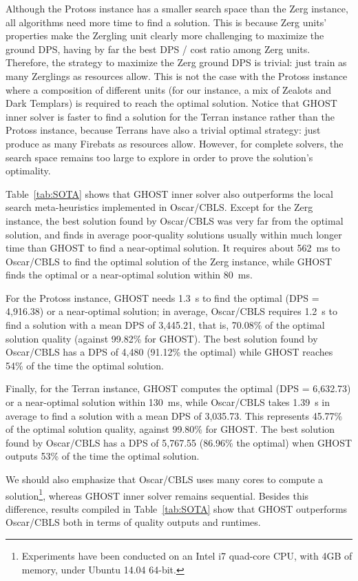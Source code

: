 \documentclass[journal]{IEEEtran}
\newcommand{\ghost}{\textsc{GHOST}\xspace}
\begin{document}
Although the Protoss instance has a smaller search space than the Zerg
instance, all algorithms  need more time to find a  solution.  This is
because Zerg  units' properties make  the Zergling unit  clearly more
challenging to maximize  the ground DPS, having by far  the best DPS /
cost ratio among  Zerg units.  Therefore, the strategy  to maximize the
Zerg ground DPS is trivial: just  train as many Zerglings as resources
allow. This  is not the case with the  Protoss instance where a
composition of different units (for our instance, a mix of Zealots and
Dark Templars) is required to  reach the optimal solution. Notice that
\ghost  inner solver is  faster to find  a solution for  the Terran
instance rather  than the  Protoss instance,  because Terrans
have also a trivial optimal strategy: just produce as many Firebats as
resources allow. However,  for complete solvers, the search  space remains
too large to explore in order to prove the solution's optimality.

Table~\ref{tab:SOTA} shows that \ghost  inner solver also outperforms
the local search meta-heuristics implemented in Oscar/CBLS. Except for
the Zerg instance, the best solution  found by Oscar/CBLS was very far
from the optimal solution, and  finds in average poor-quality solutions
usually within  much longer  time than \ghost  to find  a near-optimal
solution. It  requires about 562~ms  to Oscar/CBLS to find  the optimal
solution of  the Zerg  instance, while  \ghost finds  the optimal  or a
near-optimal solution within 80~ms.

For the Protoss instance, \ghost needs 1.3~s to find the optimal (DPS =
4,916.38) or a near-optimal  solution; in average, Oscar/CBLS requires
1.2~s to find a solution with a  mean DPS of 3,445.21, that is, 70.08\%
of the optimal solution quality (against 99.82\% for \ghost). The best
solution found by Oscar/CBLS has a  DPS of 4,480 (91.12\% the optimal)
while \ghost reaches 54\% of the time the optimal solution.

Finally, for  the Terran instance,  \ghost computes the optimal  (DPS =
6,632.73) or  a near-optimal  solution within 130~ms,  while Oscar/CBLS
takes 1.39~s in average to find a solution with a mean DPS of 3,035.73.
This  represents  45.77\% of  the  optimal  solution quality,  against
99.80\% for \ghost. The best solution found by Oscar/CBLS has a DPS of
5,767.55 (86.96\%  the optimal) when  \ghost outputs 53\% of  the time
the optimal solution.

We should also emphasize that Oscar/CBLS uses many cores to compute a solution\footnote{Experiments have been conducted on an Intel i7 quad-core CPU, with 4GB of memory, under Ubuntu 14.04 64-bit.}, whereas \ghost inner solver remains sequential. Besides this difference, results compiled in Table~\ref{tab:SOTA} show that \ghost outperforms Oscar/CBLS both in terms of quality outputs and runtimes.
\end{document}

